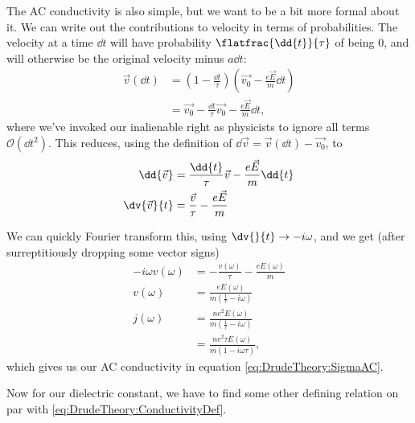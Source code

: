\documentclass[../../main.tex]{subfiles}
\begin{document}
The AC conductivity is also simple, but we want to be a bit more formal about it. We can write out the contributions to velocity in terms of probabilities. The velocity at a time $\dd{t}$ will have probability $\flatfrac{\dd{t}}{\tau}$ of being $0$, and will otherwise be the original velocity minus $a \dd{t}$:
\begin{align}
	\vec{v}(\dd{t}) &= \left(1 - \frac{\dd{t}}{\tau}\right) \left(\vec{v_0} - \frac{e \vec{E}}{m} \dd{t} \right) \\
	&= \vec{v_0} - \frac{\dd{t}}{\tau}\vec{v_0} - \frac{e \vec{E}}{m} \dd{t},
\end{align}
where we've invoked our inalienable right as physicists to ignore all terms $\mathcal{O}(\dd{t}^2)$.
This reduces, using the definition of $\dd{\vec{v}} = \vec{v}(\dd{t}) - \vec{v_0}$, to
\begin{align}
	\dd{\vec{v}} &=  \frac{\dd{t}}{\tau} \vec{v} - \frac{e \vec{E}}{m} \dd{t} \\
	\dv{\vec{v}}{t} &= \frac{\vec{v}}{\tau} - \frac{e \vec{E}}{m}
\end{align}

We can quickly Fourier transform this, using $\dv{}{t} \rightarrow -i \omega$, and we get (after surreptitiously dropping some vector signs)
\begin{align}
	-i \omega v(\omega) &= - \frac{v(\omega)}{\tau} - \frac{e E(\omega)}{m} \\
	v(\omega) &= \frac{e E(\omega)}{m \left(\frac{1}{\tau} - i\omega \right)} \\
	j(\omega) &= \frac{n e^2 E(\omega)}{m \left(\frac{1}{\tau} - i\omega \right)} \\
	&= \frac{n e^2 \tau E(\omega)}{m \left(1 - i\omega \tau \right)}, 
\end{align}
which gives us our AC conductivity in equation \eqref{eq:DrudeTheory:SigmaAC}.

Now for our dielectric constant, we have to find some other defining relation on par with \eqref{eq:DrudeTheory:ConductivityDef}.
\end{document}
